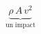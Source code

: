 \documentclass[preview]{standalone}
\begin{document}
\begin{align*}
\underbrace{\rho\,A\,v^2}_{\text{un impact}}
\end{align*}
\end{document}
